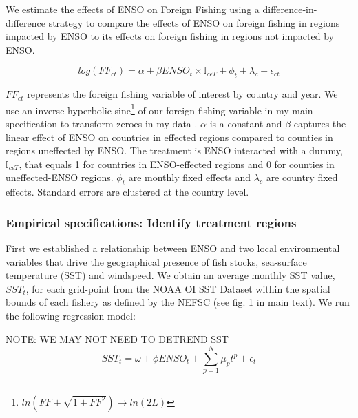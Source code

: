 \documentclass[11pt]{article}
\begin{document}
We estimate the effects of ENSO on Foreign Fishing using a difference-in-difference strategy to compare the effects of ENSO on foreign fishing in regions impacted by ENSO to its effects on foreign fishing in regions not impacted by ENSO. 

\begin{equation}
\label{eq_FF}
log(FF_{ct}) = \alpha + \beta ENSO_{t} \times \mathbb{I}_{c \epsilon T} + \phi_{t} + \lambda_{c} + \epsilon_{ct}
\end{equation}


\noindent $FF_{ct}$ represents the foreign fishing variable of interest by country and year. We use an inverse hyperbolic sine\footnote{$ln(FF+\sqrt{1+FF^2}) \xrightarrow{} ln(2L)$} of our foreign fishing variable in my main specification to transform zeroes in my data \cite{Burbidge:1988, Card:2017}. $\alpha$ is a constant and $\beta$ captures the linear effect of ENSO on countries in effected regions compared to counties in regions uneffected by ENSO. The treatment is ENSO interacted with a dummy, $\mathbb{I}_{c \epsilon T}$, that equals 1 for countries in ENSO-effected regions and 0 for counties in uneffected-ENSO regions. $\phi_{t}$ are monthly fixed effects and $\lambda_{c}$ are country fixed effects. Standard errors are clustered at the country level.

\subsubsection{Empirical specifications: Identify treatment regions}
\label{Treatment}
First we established a relationship between ENSO and two local environmental variables that drive the geographical presence of fish stocks, sea-surface temperature (SST) and windspeed. We obtain an average monthly SST value, $SST_{t}$, for each grid-point from the NOAA OI SST Dataset within the spatial bounds of each fishery as defined by the NEFSC (see fig. 1 in main text). We run the following regression model:

NOTE: WE MAY NOT NEED TO DETREND SST
\begin{equation}
\label{eq_SI_SST}
SST_{t} = \omega + \phi ENSO_{t} + \sum_{p=1}^{N} \mu_{p} t^p + \epsilon_{t} 
\end{equation}  
\end{document}
